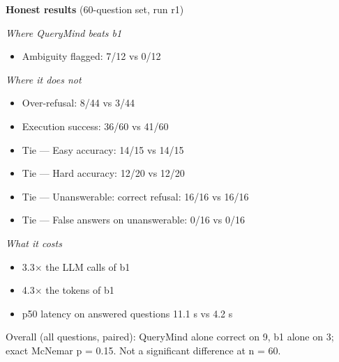 \textbf{Honest results} (60-question set, run r1)
\par\textit{Where QueryMind beats b1}
\begin{itemize}
\item Ambiguity flagged: 7/12 vs 0/12
\end{itemize}
\par\textit{Where it does not}
\begin{itemize}
\item Over-refusal: 8/44 vs 3/44
\item Execution success: 36/60 vs 41/60
\item Tie — Easy accuracy: 14/15 vs 14/15
\item Tie — Hard accuracy: 12/20 vs 12/20
\item Tie — Unanswerable: correct refusal: 16/16 vs 16/16
\item Tie — False answers on unanswerable: 0/16 vs 0/16
\end{itemize}
\par\textit{What it costs}
\begin{itemize}
\item 3.3$\times$ the LLM calls of b1
\item 4.3$\times$ the tokens of b1
\item p50 latency on answered questions 11.1 s vs 4.2 s
\end{itemize}
Overall (all questions, paired): QueryMind alone correct on 9, b1 alone on 3; exact McNemar p = 0.15. Not a significant difference at n = 60.
